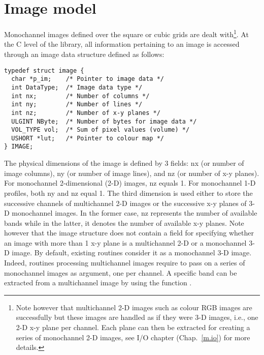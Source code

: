 \documentclass{book}
\begin{document}



\section{Image model}
Monochannel images defined over the square or cubic grids are dealt with\footnote{Note however that multichannel 2-D images such as colour RGB images are successfully but these images are handled as if they were 3-D images, i.e., one 2-D x-y plane per channel.  Each plane can then be extracted for creating a series of monochannel 2-D images, see I/O chapter (Chap.~\ref{m.io}) for more details.}.  At the C level of the library, all information pertaining to an image is accessed through an image data structure defined as follows:

\begin{verbatim}
typedef struct image {
  char *p_im;    /* Pointer to image data */
  int DataType;  /* Image data type */
  int nx;        /* Number of columns */
  int ny;        /* Number of lines */
  int nz;        /* Number of x-y planes */
  ULGINT NByte;  /* Number of bytes for image data */
  VOL_TYPE vol;  /* Sum of pixel values (volume) */
  USHORT *lut;   /* Pointer to colour map */
} IMAGE; 
\end{verbatim}

The physical dimensions of the image is defined by 3 fields: nx (or number of image columns), ny (or number of image lines), and nz (or number of x-y planes).  For monochannel 2-dimensional (2-D) images, nz equals 1.  For monochannel 1-D profiles, both ny and nz equal 1.  The third dimension is used either to store the successive channels of multichannel 2-D images or the successive x-y planes of 3-D monochannel images.  In the former case, nz represents the number of available bands while in the latter, it denotes the number of available x-y planes.  Note however that the image structure does not contain a field for specifying whether an image with more than 1 x-y plane is a multichannel 2-D or a monochannel 3-D image.  By default, existing routines consider it as a monochannel 3-D image.  Indeed, routines processing multichannel images require to pass on a series of monochannel images as argument, one per channel.  A specific band can be extracted from a multichannel image by using the function .
\end{document}
